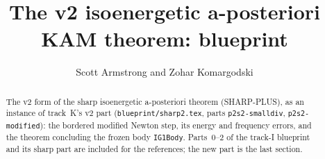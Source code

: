 \documentclass[11pt]{amsart}
\title{The v2 isoenergetic a-posteriori KAM theorem: blueprint}
\author{Scott Armstrong and Zohar Komargodski}
\begin{document}
\begin{abstract}
The v2 form of the sharp isoenergetic a-posteriori theorem (SHARP-PLUS), as an instance of track~K's v2 part (\texttt{blueprint/sharp2.tex},
parts \texttt{p2s2-smalldiv}, \texttt{p2s2-modified}): the bordered modified Newton step, its energy and frequency errors, and the theorem
concluding the frozen body \texttt{IG1Body}. Parts~0--2 of the track-I blueprint and its sharp part are included for the references; the new
part is the last section.
\end{abstract}
\maketitle
\tableofcontents





\end{document}
